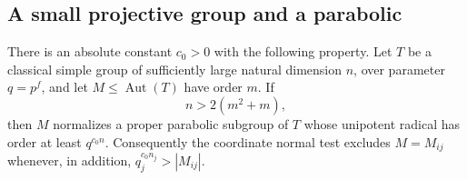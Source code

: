 \subsection{A small projective group and a parabolic}

\begin{lemma}\label{grw:small-parabolic}
There is an absolute constant $c_0>0$ with the following property.
Let $T$ be a classical simple group of sufficiently large natural
dimension $n$, over parameter $q=p^f$, and let
$M\le\operatorname{Aut}(T)$ have order $m$.  If
\[
 n>2(m^2+m),
\]
then $M$ normalizes a proper parabolic subgroup of $T$ whose unipotent
radical has order at least $q^{c_0 n}$.  Consequently the coordinate
normal test excludes $M=M_{ij}$ whenever, in addition,
$q_j^{c_0 n_j}>|M_{ij}|$.
\end{lemma}

